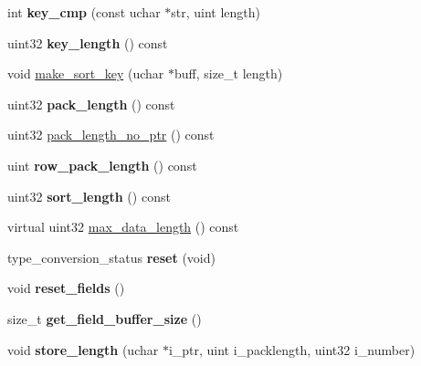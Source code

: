 \begin{DoxyCompactItemize}
\item 
\mbox{\label{classField__blob_ab7bfd83aade1a05541ac26baa77d61a5}} 
int {\bfseries key\+\_\+cmp} (const uchar $\ast$str, uint length)
\item 
\mbox{\label{classField__blob_a3fb84cfc77125a2ab6b6131e9a79b392}} 
uint32 {\bfseries key\+\_\+length} () const
\item 
void \mbox{\hyperlink{classField__blob_adfbed1cc92f6593bc9f5961cb138b5a8}{make\+\_\+sort\+\_\+key}} (uchar $\ast$buff, size\+\_\+t length)
\item 
\mbox{\label{classField__blob_ae47f4a04abead00b3f4faded376be466}} 
uint32 {\bfseries pack\+\_\+length} () const
\item 
uint32 \mbox{\hyperlink{classField__blob_a3d5a1318dd303daf7a7f7d2e1f6edf84}{pack\+\_\+length\+\_\+no\+\_\+ptr}} () const
\item 
\mbox{\label{classField__blob_aed789667562d47ff56ab03bad8aa48f9}} 
uint {\bfseries row\+\_\+pack\+\_\+length} () const
\item 
\mbox{\label{classField__blob_acd9d144a63d9927b1cef6b6579088231}} 
uint32 {\bfseries sort\+\_\+length} () const
\item 
virtual uint32 \mbox{\hyperlink{classField__blob_ae15f550d9b0f82acf200c45dc34caf07}{max\+\_\+data\+\_\+length}} () const
\item 
\mbox{\label{classField__blob_a332a129e539b46166292ee6eaaae6812}} 
type\+\_\+conversion\+\_\+status {\bfseries reset} (void)
\item 
\mbox{\label{classField__blob_a40f9e71058c58155b56e6205e0f82c86}} 
void {\bfseries reset\+\_\+fields} ()
\item 
\mbox{\label{classField__blob_a237fc718566efeeb9d4856bc74b7654d}} 
size\+\_\+t {\bfseries get\+\_\+field\+\_\+buffer\+\_\+size} ()
\item 
\mbox{\label{classField__blob_a74a021cbd451500420bee3fb29451019}} 
void {\bfseries store\+\_\+length} (uchar $\ast$i\+\_\+ptr, uint i\+\_\+packlength, uint32 i\+\_\+number)

\end{DoxyCompactItemize}
